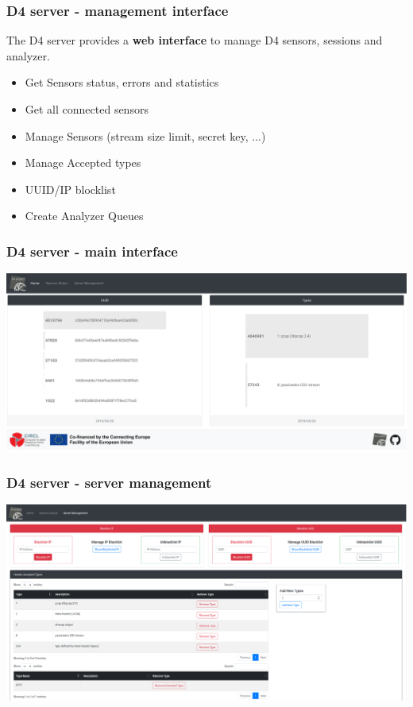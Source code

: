 \documentclass{beamer}
\begin{document}
\begin{frame}
        \frametitle{D4 server - management interface}
The D4 server provides a {\bf web interface} to manage D4 sensors, sessions and analyzer.
        \begin{itemize}
\item Get Sensors status, errors and statistics
\item Get all connected sensors
\item Manage Sensors (stream size limit, secret key, ...)
\item Manage Accepted types
\item UUID/IP blocklist
\item  Create Analyzer Queues
        \end{itemize}
\end{frame}

\begin{frame}
        \frametitle{D4 server - main interface}
        \includegraphics[width=\textwidth]{./d4-5.png}
\end{frame}

\begin{frame}
        \frametitle{D4 server - server management}
        \includegraphics[width=\textwidth]{./d4-2.png}
\end{frame}
\end{document}
